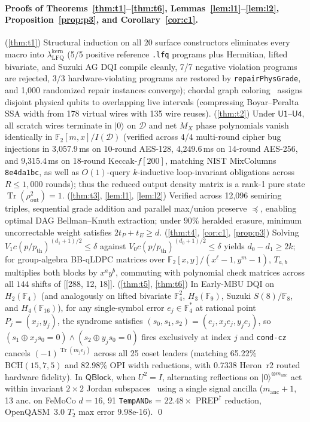 \documentclass[acmsmall,screen,anonymous]{acmart}
\DeclareRobustCommand{\_}{\ifmmode\text{\char95}\else\char95\penalty0\relax\fi}
\theoremstyle{plain}
\newcommand{\QBlock}{\ensuremath{\mathsf{QBlock}}}
\begin{document}
\paragraph{Proofs of Theorems~\ref{thm:t1}--\ref{thm:t6}, Lemmas~\ref{lem:l1}--\ref{lem:l2}, Proposition~\ref{prop:p3}, and Corollary~\ref{cor:c1}.}
(\ref{thm:t1}) Structural induction on all 20 surface constructors eliminates every macro into $\lambda_{\mathrm{LFQ}}^{\mathrm{kern}}$ (5/5 positive reference \texttt{.lfq} programs plus Hermitian, lifted bivariate, and Suzuki AG DQI compile cleanly, 7/7 negative violation programs are rejected, 3/3 hardware-violating programs are restored by \texttt{repairPhysGrade}, and 1,000 randomized repair instances converge); chordal graph coloring~\cite{hack2006} assigns disjoint physical qubits to overlapping live intervals (compressing Boyar--Peralta SSA width from 178 virtual wires with 135 wire reuses).
(\ref{thm:t2}) Under $\mathsf{U1}$--$\mathsf{U4}$, all scratch wires terminate in $|0\rangle$ on $\mathcal{D}$ and net $M_X$ phase polynomials vanish identically in $\mathbb{F}_2[m,x]/I(\mathcal{D})$ (verified across 4/4 multi-round cipher bug injections in 3,057.9\,ms on 10-round AES-128, 4,249.6\,ms on 14-round AES-256, and 9,315.4\,ms on 18-round Keccak-$f[200]$, matching NIST MixColumns \texttt{8e4da1bc}, as well as $O(1)$-query $k$-inductive loop-invariant obligations across $R \le 1,000$ rounds); thus the reduced output density matrix is a rank-1 pure state $\operatorname{Tr}(\rho_{\mathrm{out}}^2) = 1$.
(\ref{thm:t3}, \ref{lem:l1}, \ref{lem:l2}) Verified across 12,096 semiring triples, sequential grade addition and parallel max/union preserve $\preceq$, enabling optimal DAG Bellman--Knuth extraction; under $90\%$ heralded erasure, minimum uncorrectable weight satisfies $2 t_P + t_E \ge d$.
(\ref{thm:t4}, \ref{cor:c1}, \ref{prop:p3}) Solving $V_1 c(p/p_{\mathrm{th}})^{(d_1+1)/2} \le \delta$ against $V_0 c(p/p_{\mathrm{th}})^{(d_0+1)/2} \le \delta$ yields $d_0 - d_1 \ge 2k$; for group-algebra BB-qLDPC matrices over $\mathbb{F}_2[x,y]/(x^\ell - 1, y^m - 1)$, $T_{a,b}$ multiplies both blocks by $x^a y^b$, commuting with polynomial check matrices across all $144$ shifts of [[288, 12, 18]].
(\ref{thm:t5}, \ref{thm:t6}) In Early-MBU DQI on $H_2(\mathbb{F}_4)$ (and analogously on lifted bivariate $\mathbb{F}_4^2$, $H_3(\mathbb{F}_9)$, Suzuki $S(8)/\mathbb{F}_8$, and $H_4(\mathbb{F}_{16})$), for any single-symbol error $e_j \in \mathbb{F}_4^*$ at rational point $P_j = (x_j, y_j)$, the syndrome satisfies $(s_0, s_1, s_2) = (e_j, x_j e_j, y_j e_j)$, so $(s_1 \oplus x_j s_0 = 0) \land (s_2 \oplus y_j s_0 = 0)$ fires exclusively at index $j$ and \texttt{cond-cz} cancels $(-1)^{\operatorname{Tr}(m_j e_j)}$ across all 25 coset leaders (matching 65.22\% $\mathrm{BCH}(15,7,5)$ and 82.98\% OPI width reductions, with 0.7338 Heron~r2 routed hardware fidelity). In $\QBlock$, when $U^2 = I$, alternating reflections on $|0\rangle^{\otimes m_{\mathrm{anc}}}$ act within invariant $2\times 2$ Jordan subspaces~\cite{gilyen2019} using a single signal ancilla ($m_{\mathrm{anc}} + 1$, 13 anc. on FeMoCo $d=16$, 91 \texttt{TempAND}s = $22.48\times$ $\mathrm{PREP}^\dagger$ reduction, OpenQASM~3.0 $T_2$ max error 9.98e-16). \qed
\end{document}
